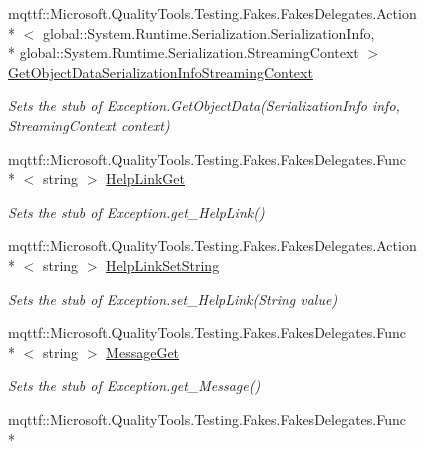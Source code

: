 \begin{DoxyCompactItemize}
mqttf\-::\-Microsoft.\-Quality\-Tools.\-Testing.\-Fakes.\-Fakes\-Delegates.\-Action\\*
$<$ global\-::\-System.\-Runtime.\-Serialization.\-Serialization\-Info, \\*
global\-::\-System.\-Runtime.\-Serialization.\-Streaming\-Context $>$ \hyperlink{class_system_1_1_runtime_1_1_interop_services_1_1_fakes_1_1_stub_s_e_h_exception_a73fe312044aa8b2667d064e58db0a8f1}{Get\-Object\-Data\-Serialization\-Info\-Streaming\-Context}
\begin{DoxyCompactList}\small\item\em Sets the stub of Exception.\-Get\-Object\-Data(\-Serialization\-Info info, Streaming\-Context context)\end{DoxyCompactList}\item 
mqttf\-::\-Microsoft.\-Quality\-Tools.\-Testing.\-Fakes.\-Fakes\-Delegates.\-Func\\*
$<$ string $>$ \hyperlink{class_system_1_1_runtime_1_1_interop_services_1_1_fakes_1_1_stub_s_e_h_exception_a175850ed1c51444abd637c04829f641c}{Help\-Link\-Get}
\begin{DoxyCompactList}\small\item\em Sets the stub of Exception.\-get\-\_\-\-Help\-Link()\end{DoxyCompactList}\item 
mqttf\-::\-Microsoft.\-Quality\-Tools.\-Testing.\-Fakes.\-Fakes\-Delegates.\-Action\\*
$<$ string $>$ \hyperlink{class_system_1_1_runtime_1_1_interop_services_1_1_fakes_1_1_stub_s_e_h_exception_a9c96442673a22db2e7248261d6ba8667}{Help\-Link\-Set\-String}
\begin{DoxyCompactList}\small\item\em Sets the stub of Exception.\-set\-\_\-\-Help\-Link(\-String value)\end{DoxyCompactList}\item 
mqttf\-::\-Microsoft.\-Quality\-Tools.\-Testing.\-Fakes.\-Fakes\-Delegates.\-Func\\*
$<$ string $>$ \hyperlink{class_system_1_1_runtime_1_1_interop_services_1_1_fakes_1_1_stub_s_e_h_exception_afce49e3e9952be7df493d979f3209946}{Message\-Get}
\begin{DoxyCompactList}\small\item\em Sets the stub of Exception.\-get\-\_\-\-Message()\end{DoxyCompactList}\item 
mqttf\-::\-Microsoft.\-Quality\-Tools.\-Testing.\-Fakes.\-Fakes\-Delegates.\-Func\\*

\end{DoxyCompactItemize}
